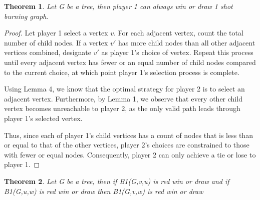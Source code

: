 \documentclass{article}
\newtheorem{theorem}{Theorem}
\begin{document}
\begin{theorem}
Let G be a tree, then player 1 can always win or draw 1 shot burning graph.
\end{theorem}

\begin{proof}
Let player 1 select a vertex \(v\). For each adjacent vertex, count the total number of child nodes. If a vertex \(v'\) has more child nodes than all other adjacent vertices combined, designate \(v'\) as player 1's choice of vertex. Repeat this process until every adjacent vertex has fewer or an equal number of child nodes compared to the current choice, at which point player 1's selection process is complete.

Using Lemma 4, we know that the optimal strategy for player 2 is to select an adjacent vertex. Furthermore, by Lemma 1, we observe that every other child vertex becomes unreachable to player 2, as the only valid path leads through player 1’s selected vertex.

Thus, since each of player 1's child vertices has a count of nodes that is less than or equal to that of the other vertices, player 2’s choices are constrained to those with fewer or equal nodes. Consequently, player 2 can only achieve a tie or lose to player 1.
\end{proof}


\begin{theorem}
Let G be a tree, then if B1(G,v,u) is red win or draw and if B1(G,u,w) is red win or draw then B1(G,v,w) is red win or draw 
\end{theorem}
\end{document}
